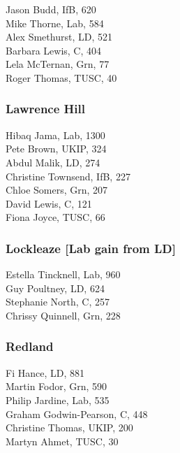 \documentclass[a4paper,openany,10pt]{book}
\begin{document}


Jason Budd, IfB, 620\\
Mike Thorne, Lab, 584\\
Alex Smethurst, LD, 521\\
Barbara Lewis, C, 404\\
Lela McTernan, Grn, 77\\
Roger Thomas, TUSC, 40\\


\subsubsection*{Lawrence Hill}



Hibaq Jama, Lab, 1300\\
Pete Brown, UKIP, 324\\
Abdul Malik, LD, 274\\
Christine Townsend, IfB, 227\\
Chloe Somers, Grn, 207\\
David Lewis, C, 121\\
Fiona Joyce, TUSC, 66\\


\subsubsection*{Lockleaze \hspace*{\fill}\nolinebreak[1]%
\enspace\hspace*{\fill}
[Lab gain from LD]}



Estella Tincknell, Lab, 960\\
Guy Poultney, LD, 624\\
Stephanie North, C, 257\\
Chrissy Quinnell, Grn, 228\\


\subsubsection*{Redland}



Fi Hance, LD, 881\\
Martin Fodor, Grn, 590\\
Philip Jardine, Lab, 535\\
{Graham Godwin-Pearson}, C, 448\\
Christine Thomas, UKIP, 200\\
Martyn Ahmet, TUSC, 30\\
\end{document}
